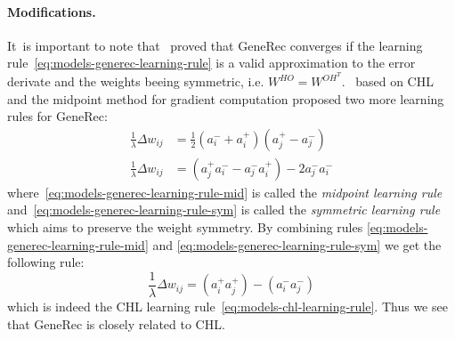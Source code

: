 \paragraph{Modifications.}
\label{sec:our-learning-rules}
\label{sec:models-generec-modifications} 
It~is important to note that~\citet{o1996bio} proved that GeneRec converges if the learning rule~\ref{eq:models-generec-learning-rule} is a valid approximation to the error derivate and the weights beeing symmetric, i.e. $W^{HO} = W^{OH^{T}}$.~\citet{o1996bio} based on CHL and the midpoint method for gradient computation proposed two more learning rules for GeneRec:
\begin{align}
  \label{eq:models-generec-learning-rule-mid}
  \frac{1}{\lambda} \Delta w_{ij} &=  \frac{1}{2}(a^{-}_i + a^{+}_i)(a^{+}_j - a^{-}_j) \\
  \label{eq:models-generec-learning-rule-sym}
  \frac{1}{\lambda} \Delta w_{ij} &=  (a^{+}_j a^{-}_i - a^{-}_j a^{+}_i) - 2a^{-}_j a^{-}_i
\end{align}
where~\ref{eq:models-generec-learning-rule-mid} is called the \emph{midpoint learning rule} and~\ref{eq:models-generec-learning-rule-sym} is called the \emph{symmetric learning rule} which aims to preserve the weight symmetry. By combining rules \ref{eq:models-generec-learning-rule-mid} and \ref{eq:models-generec-learning-rule-sym} we get the following rule: 
\begin{equation}
  \label{eq:models-generec-learning-rule-chl}
  \frac{1}{\lambda} \Delta w_{ij} = (a^{+}_i a^{+}_j) - (a^{-}_i a^{-}_j)
\end{equation}
which is indeed the CHL learning rule~\ref{eq:models-chl-learning-rule}. Thus we see that GeneRec is closely related to CHL. 

